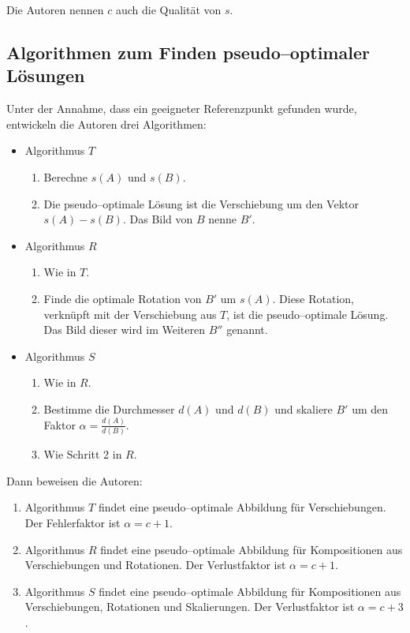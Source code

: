 Die Autoren nennen $c$ auch die Qualität von $s$.

\subsection{Algorithmen zum Finden pseudo--optimaler Lösungen}

Unter der Annahme, dass ein geeigneter Referenzpunkt gefunden wurde, entwickeln die Autoren drei Algorithmen:
\begin{itemize}
\item Algorithmus $T$
\begin{enumerate}
\item Berechne $s(A)$ und $s(B)$.
\item Die pseudo--optimale Lösung ist die Verschiebung um den Vektor $s(A)-s(B)$. Das Bild von $B$ nenne $B'$.
\end{enumerate}

\item Algorithmus $R$
\begin{enumerate}
\item Wie in $T$.
\item Finde die optimale Rotation von $B'$ um $s(A)$. Diese Rotation, verknüpft mit der Verschiebung aus $T$, ist die pseudo--optimale Lösung. Das Bild dieser wird im Weiteren $B''$ genannt.

\end{enumerate}
\item Algorithmus $S$
\begin{enumerate}
\item Wie in $R$.
\item Bestimme die Durchmesser $d(A)$ und $d(B)$ und skaliere $B'$ um den Faktor $\alpha =\frac{d(A)}{d(B)}$.
\item Wie Schritt 2 in $R$.
\end{enumerate}
\end{itemize}

Dann beweisen die Autoren:
\begin{enumerate}
\item Algorithmus $T$ findet eine pseudo--optimale Abbildung für Verschiebungen. Der Fehlerfaktor ist $\alpha=c+1$.
\item Algorithmus $R$ findet eine pseudo--optimale Abbildung für Kompositionen aus Verschiebungen und Rotationen.  Der Verlustfaktor ist $\alpha=c+1$.
\item Algorithmus $S$ findet eine pseudo--optimale Abbildung für Kompositionen aus Verschiebungen, Rotationen und Skalierungen. Der Verlustfaktor ist $\alpha=c+3$.
\end{enumerate}

